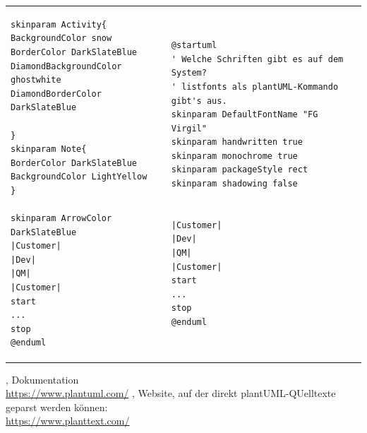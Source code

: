 \documentclass[10pt]{scrartcl}
\begin{document}
\begin{tabular}[b]{p{5.5cm} p{5.5cm} p{5.5cm}}
\begin{lstlisting}[style=plantuml]
skinparam Activity{
BackgroundColor snow
BorderColor DarkSlateBlue
DiamondBackgroundColor ghostwhite
DiamondBorderColor DarkSlateBlue

}
skinparam Note{
BorderColor DarkSlateBlue
BackgroundColor LightYellow
}

skinparam ArrowColor DarkSlateBlue
|Customer|
|Dev|
|QM|
|Customer|
start
...
stop 
@enduml
	\end{lstlisting}
	
	&
	
	
	\begin{lstlisting}[style=plantuml]
@startuml
' Welche Schriften gibt es auf dem System?
' listfonts als plantUML-Kommando gibt's aus.
skinparam DefaultFontName "FG Virgil"
skinparam handwritten true
skinparam monochrome true
skinparam packageStyle rect
skinparam shadowing false


|Customer|
|Dev|
|QM|
|Customer|
start
...
stop 
@enduml
	\end{lstlisting}
	
\end{tabular}

\begin{thebibliography}{9}
	,
	Dokumentation \\
	\url{	https://www.plantuml.com/}
	,
	Website, auf der direkt plantUML-QUelltexte geparst werden können: \\\url{https://www.planttext.com/}
\end{thebibliography}
\end{document}
